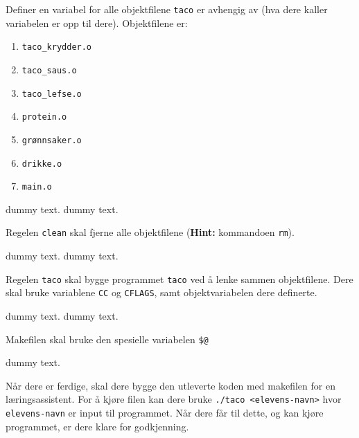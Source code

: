 \begin{subprob}
    Definer en variabel for alle objektfilene \verb|taco| er avhengig av (hva dere kaller variabelen er opp til dere). Objektfilene er:
    \begin{enumerate}
        \item \verb|taco_krydder.o|
        \item \verb|taco_saus.o|
        \item \verb|taco_lefse.o|
        \item \verb|protein.o|
        \item \verb|grønnsaker.o|
        \item \verb|drikke.o|
        \item \verb|main.o|	
    \end{enumerate}
	\begin{solution}
        dummy text. dummy text. 
	\end{solution}
\end{subprob}


\begin{subprob}
    Regelen \verb|clean| skal fjerne alle objektfilene (\textbf{Hint:} kommandoen \verb|rm|).
	\begin{solution}
        dummy text. dummy text. 
	\end{solution}
\end{subprob}


\begin{subprob}
    Regelen \verb|taco| skal bygge programmet \verb|taco| ved å lenke sammen objektfilene. Dere skal bruke variablene \verb|CC| og \verb|CFLAGS|, samt objektvariabelen dere definerte.
	\begin{solution}
        dummy text. dummy text. 
	\end{solution}
\end{subprob}


\begin{subprob}
    Makefilen skal bruke den spesielle variabelen \verb|$@|
	\begin{solution}
	    dummy text. 
	\end{solution}
\end{subprob}



Når dere er ferdige, skal dere bygge den utleverte koden med makefilen for en læringsassistent. For å kjøre filen kan dere bruke \verb|./taco <elevens-navn>| hvor \verb|elevens-navn| er input til programmet. Når dere får til dette, og kan kjøre programmet, er dere klare for godkjenning.

